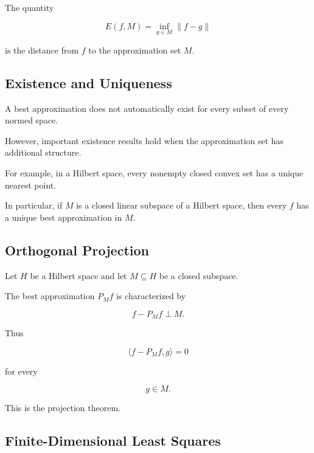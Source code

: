 The quantity

\[
\boxed{
E(f,M)
=
\inf_{g\in M}\|f-g\|
}
\]

is the distance from \(f\) to the approximation set \(M\).

\subsection{Existence and Uniqueness}
\label{subsec:best-approximation-existence}

A best approximation does not automatically exist for every subset of
every normed space.

However, important existence results hold when the approximation set has
additional structure.

For example, in a Hilbert space, every nonempty closed convex set has a
unique nearest point.

In particular, if \(M\) is a closed linear subspace of a Hilbert space,
then every \(f\) has a unique best approximation in \(M\).

\subsection{Orthogonal Projection}
\label{subsec:approximation-orthogonal-projection}

Let \(H\) be a Hilbert space and let \(M\subseteq H\) be a closed
subspace.

The best approximation \(P_Mf\) is characterized by

\[
\boxed{
f-P_Mf
\perp
M.
}
\]

Thus

\[
\boxed{
\langle
f-P_Mf,
g
\rangle
=
0
}
\]

for every

\[
g\in M.
\]

This is the projection theorem.

\subsection{Finite-Dimensional Least Squares}
\label{subsec:finite-dimensional-least-squares}

